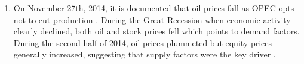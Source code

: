 \documentclass[11pt]{article}
\theoremstyle{definition}
\begin{document}
\begin{enumerate}
\begin{enumerate}
  \item On November 27th, 2014, it is documented that oil prices fall as OPEC opts not to cut production \citep{huppmann2015opec}. During the Great Recession when economic activity clearly declined, both oil and stock prices fell which points to demand factors. During the second half of 2014, oil prices plummeted but equity prices generally increased, suggesting that supply factors were the key driver \citep[Page 19]{baffes2015great}. 
  \end{enumerate}
\end{enumerate}





\end{document}
